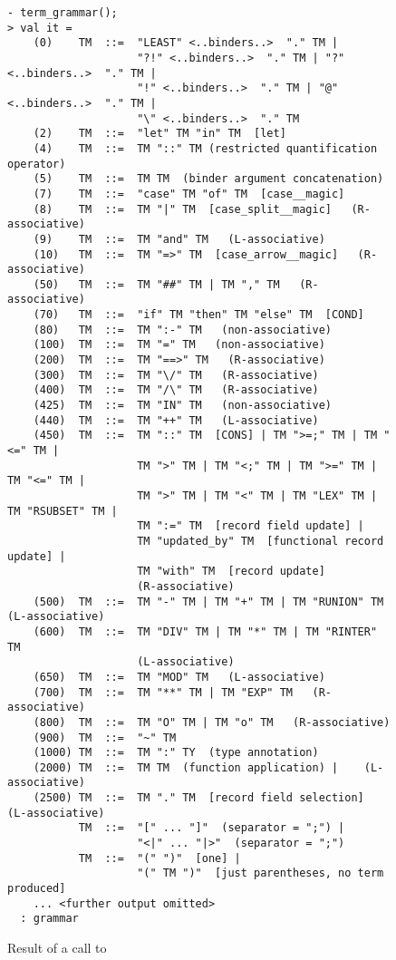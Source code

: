 \setcounter{sessioncount}{0}
\begin{figure}[htbp]
\begin{session}
\begin{verbatim}
- term_grammar();
> val it =
    (0)    TM  ::=  "LEAST" <..binders..>  "." TM |
                    "?!" <..binders..>  "." TM | "?" <..binders..>  "." TM |
                    "!" <..binders..>  "." TM | "@" <..binders..>  "." TM |
                    "\" <..binders..>  "." TM
    (2)    TM  ::=  "let" TM "in" TM  [let]
    (4)    TM  ::=  TM "::" TM (restricted quantification operator)
    (5)    TM  ::=  TM TM  (binder argument concatenation)
    (7)    TM  ::=  "case" TM "of" TM  [case__magic]
    (8)    TM  ::=  TM "|" TM  [case_split__magic]   (R-associative)
    (9)    TM  ::=  TM "and" TM   (L-associative)
    (10)   TM  ::=  TM "=>" TM  [case_arrow__magic]   (R-associative)
    (50)   TM  ::=  TM "##" TM | TM "," TM   (R-associative)
    (70)   TM  ::=  "if" TM "then" TM "else" TM  [COND]
    (80)   TM  ::=  TM ":-" TM   (non-associative)
    (100)  TM  ::=  TM "=" TM   (non-associative)
    (200)  TM  ::=  TM "==>" TM   (R-associative)
    (300)  TM  ::=  TM "\/" TM   (R-associative)
    (400)  TM  ::=  TM "/\" TM   (R-associative)
    (425)  TM  ::=  TM "IN" TM   (non-associative)
    (440)  TM  ::=  TM "++" TM   (L-associative)
    (450)  TM  ::=  TM "::" TM  [CONS] | TM ">=;" TM | TM "<=" TM |
                    TM ">" TM | TM "<;" TM | TM ">=" TM | TM "<=" TM |
                    TM ">" TM | TM "<" TM | TM "LEX" TM | TM "RSUBSET" TM |
                    TM ":=" TM  [record field update] |
                    TM "updated_by" TM  [functional record update] |
                    TM "with" TM  [record update]
                    (R-associative)
    (500)  TM  ::=  TM "-" TM | TM "+" TM | TM "RUNION" TM   (L-associative)
    (600)  TM  ::=  TM "DIV" TM | TM "*" TM | TM "RINTER" TM
                    (L-associative)
    (650)  TM  ::=  TM "MOD" TM   (L-associative)
    (700)  TM  ::=  TM "**" TM | TM "EXP" TM   (R-associative)
    (800)  TM  ::=  TM "O" TM | TM "o" TM   (R-associative)
    (900)  TM  ::=  "~" TM
    (1000) TM  ::=  TM ":" TY  (type annotation)
    (2000) TM  ::=  TM TM  (function application) |    (L-associative)
    (2500) TM  ::=  TM "." TM  [record field selection]   (L-associative)
           TM  ::=  "[" ... "]"  (separator = ";") |
                    "<|" ... "|>"  (separator = ";")
           TM  ::=  "(" ")"  [one] |
                    "(" TM ")"  [just parentheses, no term produced]
    ... <further output omitted>
  : grammar
\end{verbatim}
\end{session}
\caption{Result of a call to }
\label{fig:term-grammar}
\end{figure}

